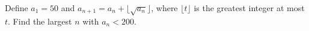 Define $a_1=50$ and $a_{n+1}=a_n+\lfloor\sqrt{a_n}\rfloor$, where $\lfloor t\rfloor$ is the greatest integer at most $t$. Find the largest $n$ with $a_n<200$.
